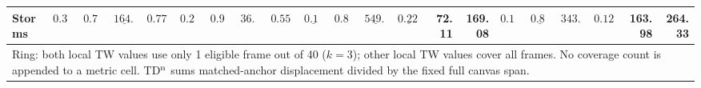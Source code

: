\begin{table}[t]
{\begin{tabular}{lrrrrrrrrrrrrrrrrrrrr}
Storms & $0.340$ & $0.710$ & $\underline{164.14}$ & $0.7789$ & $0.210$ & $\mathbf{0.940}$ & $\mathbf{36.24}$ & $0.5598$ & $\underline{0.176}$ & $0.861$ & $\underline{549.42}$ & $\underline{0.2274}$ & 72.11 & 169.08 & $\mathbf{0.112}$ & $\underline{0.872}$ & $\mathbf{343.43}$ & $\mathbf{0.1240}$ & 163.98 & 264.33 \\
\midrule
\multicolumn{21}{p{\dimexpr\textwidth-3pt\relax}}{Ring: both local TW values use only 1 eligible frame out of 40 ($k=3$); other local TW values cover all frames. No coverage count is appended to a metric cell. TD$^{\rm n}$ sums matched-anchor displacement divided by the fixed full canvas span.} \\
\bottomrule
\end{tabular}
}
\end{table}
